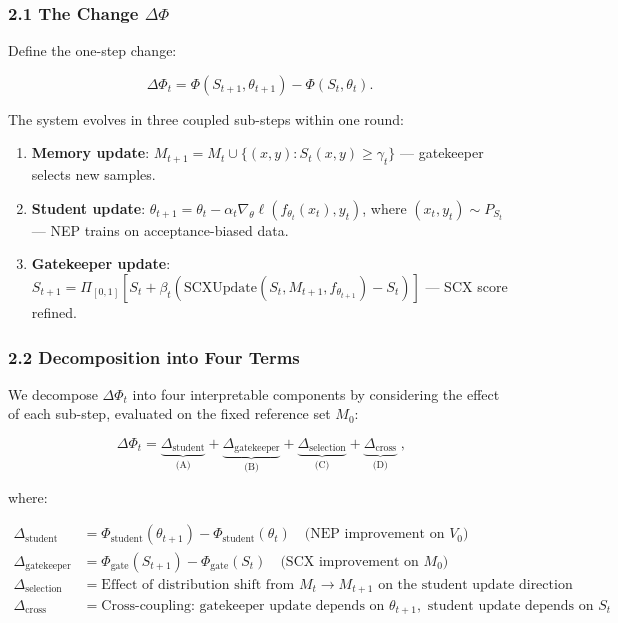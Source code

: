 \documentclass[
  12pt,
]{article}
\providecommand{\tightlist}{%
  \setlength{\itemsep}{0pt}\setlength{\parskip}{0pt}}
\begin{document}
\subsubsection{\texorpdfstring{2.1 The Change
\(\Delta\Phi\)}{2.1 The Change \textbackslash Delta\textbackslash Phi}}\label{the-change-deltaphi}

Define the one-step change:

\[\Delta\Phi_t = \Phi(S_{t+1}, \theta_{t+1}) - \Phi(S_t, \theta_t).\]

The system evolves in three coupled sub-steps within one round:

\begin{enumerate}
\def\labelenumi{\arabic{enumi}.}
\tightlist
\item
  \textbf{Memory update}:
  \(M_{t+1} = M_t \cup \{(x,y) : S_t(x,y) \geq \gamma_t\}\) ---
  gatekeeper selects new samples.
\item
  \textbf{Student update}:
  \(\theta_{t+1} = \theta_t - \alpha_t \nabla_\theta \ell(f_{\theta_t}(x_t), y_t)\),
  where \((x_t, y_t) \sim P_{S_t}\) --- NEP trains on acceptance-biased
  data.
\item
  \textbf{Gatekeeper update}:
  \(S_{t+1} = \Pi_{[0,1]}[S_t + \beta_t (\text{SCXUpdate}(S_t, M_{t+1}, f_{\theta_{t+1}}) - S_t)]\)
  --- SCX score refined.
\end{enumerate}

\subsubsection{2.2 Decomposition into Four
Terms}\label{decomposition-into-four-terms}

We decompose \(\Delta\Phi_t\) into four interpretable components by
considering the effect of each sub-step, evaluated on the fixed
reference set \(M_0\):

\[\boxed{\;\Delta\Phi_t = \underbrace{\Delta_{\text{student}}}_{\text{(A)}} + \underbrace{\Delta_{\text{gatekeeper}}}_{\text{(B)}} + \underbrace{\Delta_{\text{selection}}}_{\text{(C)}} + \underbrace{\Delta_{\text{cross}}}_{\text{(D)}}\;},\]

where:

\[\begin{aligned}
\Delta_{\text{student}} &= \Phi_{\text{student}}(\theta_{t+1}) - \Phi_{\text{student}}(\theta_t) \quad \text{(NEP improvement on } V_0 \text{)} \\[4pt]
\Delta_{\text{gatekeeper}} &= \Phi_{\text{gate}}(S_{t+1}) - \Phi_{\text{gate}}(S_t) \quad \text{(SCX improvement on } M_0 \text{)} \\[4pt]
\Delta_{\text{selection}} &= \text{Effect of distribution shift from } M_t \to M_{t+1} \text{ on the student update direction} \\[4pt]
\Delta_{\text{cross}} &= \text{Cross-coupling: gatekeeper update depends on } \theta_{t+1}, \text{ student update depends on } S_t
\end{aligned}\]
\end{document}
